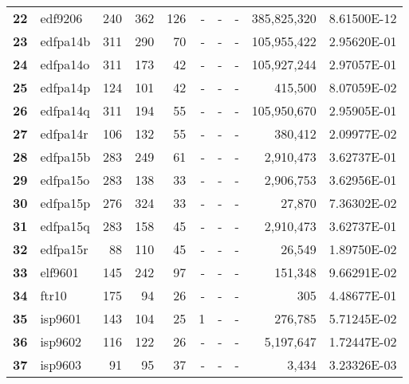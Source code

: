 \begin{longtable}{@{}llrrrrrrrc@{}}
\textbf{22} & edf9206  & 240                  & 362      & 126     & -    & -    & -     & 385,825,320          & 8.61500E-12 \\
\textbf{23} & edfpa14b & 311                  & 290      & 70      & -    & -    & -     & 105,955,422          & 2.95620E-01 \\
\textbf{24} & edfpa14o & 311                  & 173      & 42      & -    & -    & -     & 105,927,244          & 2.97057E-01 \\
\textbf{25} & edfpa14p & 124                  & 101      & 42      & -    & -    & -     & 415,500              & 8.07059E-02 \\
\textbf{26} & edfpa14q & 311                  & 194      & 55      & -    & -    & -     & 105,950,670          & 2.95905E-01 \\
\textbf{27} & edfpa14r & 106                  & 132      & 55      & -    & -    & -     & 380,412              & 2.09977E-02 \\
\textbf{28} & edfpa15b & 283                  & 249      & 61      & -    & -    & -     & 2,910,473            & 3.62737E-01 \\
\textbf{29} & edfpa15o & 283                  & 138      & 33      & -    & -    & -     & 2,906,753            & 3.62956E-01 \\
\textbf{30} & edfpa15p & 276                  & 324      & 33      & -    & -    & -     & 27,870               & 7.36302E-02 \\
\textbf{31} & edfpa15q & 283                  & 158      & 45      & -    & -    & -     & 2,910,473            & 3.62737E-01 \\
\textbf{32} & edfpa15r & 88                   & 110      & 45      & -    & -    & -     & 26,549               & 1.89750E-02 \\
\textbf{33} & elf9601  & 145                  & 242      & 97      & -    & -    & -     & 151,348              & 9.66291E-02 \\
\textbf{34} & ftr10    & 175                  & 94       & 26      & -    & -    & -     & 305                  & 4.48677E-01 \\
\textbf{35} & isp9601  & 143                  & 104      & 25      & 1    & -    & -     & 276,785              & 5.71245E-02 \\
\textbf{36} & isp9602  & 116                  & 122      & 26      & -    & -    & -     & 5,197,647            & 1.72447E-02 \\
\textbf{37} & isp9603  & 91                   & 95       & 37      & -    & -    & -     & 3,434                & 3.23326E-03 \\

\end{longtable}
